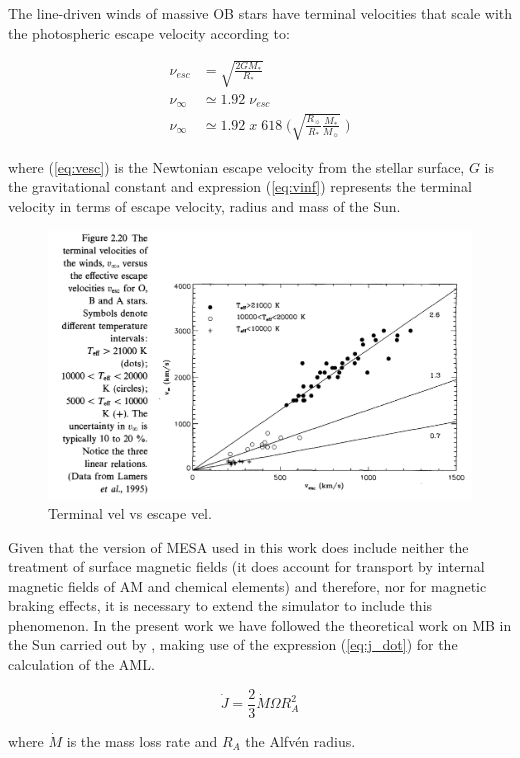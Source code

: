\documentclass[fleqn,usenatbib]{mnras}
\begin{document}
The line-driven winds of massive OB stars have terminal velocities that scale with the photospheric escape velocity \citep{Lamers2000} according to:
\begin{ceqn}
\begin{align}
\nu_{esc} &= \sqrt{\frac{2GM_*}{R_*}} \label{eq:vesc} \\
\nu_\infty &\simeq 1.92 \;\nu_{esc}\\
\nu_\infty &\simeq 1.92 \; x \; 618 \; \Bigg(\sqrt{\frac{R_{\sun}}{R_*}\frac{M_*}{M_{\sun}}} \;\Bigg) \label{eq:vinf}
\end{align}
\end{ceqn}
where (\ref{eq:vesc}) is the Newtonian escape velocity from the stellar surface, $G$ is the gravitational constant and expression (\ref{eq:vinf}) represents the terminal velocity in terms of escape velocity, radius and mass of the Sun.\par

\begin{figure}
	\includegraphics[width=\columnwidth]{figures/terminal_vel_vs_escape_vel.png}
    \caption {Terminal vel vs escape vel.}
    \label{fig:terminal_vel_vs_escape_vel}
\end{figure}

Given that the version of MESA used in this work does include neither the treatment of surface magnetic fields (it does account for transport by internal magnetic fields of AM and chemical elements) and therefore, nor for magnetic braking effects, it is necessary to extend the simulator to include this phenomenon. In the present work we have followed the theoretical work on MB in the Sun carried out by \citet{Weber1967}, making use of the expression (\ref{eq:j_dot}) for the calculation of the AML.
\begin{ceqn}
\begin{equation}
 \Dot{J} = \frac{2}{3} \Dot{M}\Omega R^{2}_{A} \label{eq:j_dot}
\end{equation}
\end{ceqn}
where $\Dot{M}$ is the mass loss rate and $R_A$ the Alfv\'{e}n radius. \par
\end{document}
